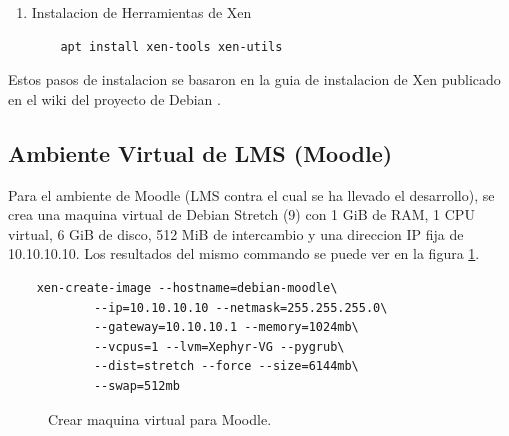 \begin{enumerate}
\begin{lstlisting}
    auto xenbr0
    iface xenbr0 inet static
       address 10.10.10.1
       netmask 255.255.255.0
       bridge_ports wlan0

    #other possibly useful options in a\
    	virtualized environment
      #bridge_stp off       # disable \
      		Spanning Tree Protocol
      #bridge_waitport 0    # no delay \
      		before a port becomes available
      #bridge_fd 0          # no forwarding\
      		delay

    ## configure a (separate) bridge for\
    	the DomUs without giving Dom0 an\
        IP on it
    #auto xenbr1
    #iface xenbr1 inet manual
    #   bridge_ports eth1

    EOF

    reboot
		\end{lstlisting}
	\item Instalacion de Herramientas de Xen
		\begin{lstlisting}
	apt install xen-tools xen-utils
		\end{lstlisting}
\end{enumerate}

Estos pasos de instalacion se basaron en la guia de instalacion de Xen publicado en el wiki del proyecto de Debian \citep{Debian-Wiki-Xen}.

\subsection{Ambiente Virtual de LMS (Moodle)}

Para el ambiente de Moodle (LMS contra el cual se ha llevado el desarrollo), se crea una maquina virtual de Debian Stretch (9) con 1 GiB de RAM, 1 CPU virtual, 6 GiB de disco, 512 MiB de intercambio y una direccion IP fija de 10.10.10.10. Los resultados del mismo commando se puede ver en la figura \ref{vm-moodle}.
\begin{lstlisting}
	xen-create-image --hostname=debian-moodle\
    		--ip=10.10.10.10 --netmask=255.255.255.0\
        	--gateway=10.10.10.1 --memory=1024mb\
        	--vcpus=1 --lvm=Xephyr-VG --pygrub\
        	--dist=stretch --force --size=6144mb\
        	--swap=512mb
\end{lstlisting}

\begin{figure}
	\begin{center}
    \end{center}
  	\caption{Crear maquina virtual para Moodle.}
    \label{vm-moodle}
\end{figure}

